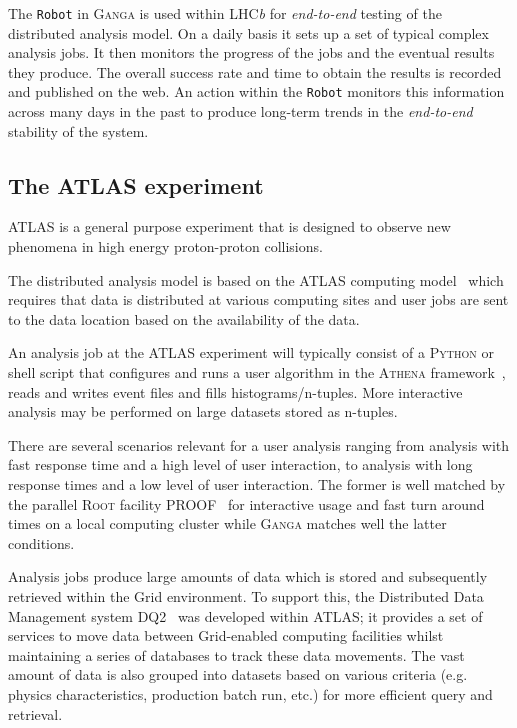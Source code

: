 \documentclass{elsart}
\def\lhcb {LHC{\em b\/}\xspace}
\def\atlas {ATLAS\xspace}
\def\ganga {\textsc{Ganga}\xspace}
\def\python {\textsc{Python}\xspace}
\def\root {\textsc{Root}\xspace}
\def\athena {\textsc{Athena}\xspace}
\def\grid {Grid\xspace}
\newcommand{\code}[1]{\texttt{#1}}
\begin{document}
The \code{Robot} in \ganga is used within \lhcb for \emph{end-to-end} testing
of the distributed analysis model. On a daily basis it sets up a set of
typical complex analysis jobs. It then monitors the progress of the jobs and
the eventual results they produce. The overall success rate and time to obtain
the results is recorded and published on the web. An action within the
\code{Robot} monitors this information across many days in the past to produce
long-term trends in the \emph{end-to-end} stability of the system.

\subsection{The \atlas experiment}
\label{sec:atlas}

ATLAS is a general purpose experiment that is designed to observe new
phenomena in high energy proton-proton collisions.

The distributed analysis model is based on the \atlas computing
model~\cite{bib:atlascompmod} which requires that data is distributed at
various computing sites and user jobs are sent to the data location based on
the availability of the data.

An analysis job at the \atlas experiment will typically consist of a \python
or shell script that configures and runs a user algorithm in the \athena
framework~\cite{bib:atlascompmod}, reads and writes event files and
fills histograms/n-tuples. More interactive analysis may be performed on
large datasets stored as n-tuples.

There are several scenarios relevant for a user analysis ranging from analysis
with fast response time and a high level of user interaction, to analysis with
long response times and a low level of user interaction. The former is well
matched by the parallel \root facility PROOF~\cite{ROOT} for interactive usage
and fast turn around times on a local computing cluster while \ganga matches
well the latter conditions.

Analysis jobs produce large amounts of data which is stored and subsequently
retrieved within the \grid environment. To support this, the Distributed Data
Management system DQ2~\cite{bib:atlasdq2} was developed within \atlas; it provides
a set of services to move data between \grid-enabled computing facilities
whilst maintaining a series of databases to track these data movements.  The
vast amount of data is also grouped into datasets based on various criteria
(e.g.  physics characteristics, production batch run, etc.) for more efficient
query and retrieval.
\end{document}
